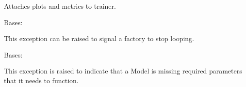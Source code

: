 \documentclass[letterpaper,10pt,english]{sphinxmanual}
\begin{document}
\begin{fulllineitems}

\begin{fulllineitems}
\label{\detokenize{Fireworks:Fireworks.toolbox.preprocessing.Normalizer.reset}}
\end{fulllineitems}


\end{fulllineitems}

\label{\detokenize{Fireworks:module-Fireworks.utils.events}}

\begin{fulllineitems}
\label{\detokenize{Fireworks:Fireworks.utils.events.visdom_loss_handler}}
Attaches plots and metrics to trainer.

\end{fulllineitems}

\label{\detokenize{Fireworks:module-Fireworks.utils.exceptions}}

\begin{fulllineitems}
\label{\detokenize{Fireworks:Fireworks.utils.exceptions.EndHyperparameterOptimization}}
Bases: 

This exception can be raised to signal a factory to stop looping.

\end{fulllineitems}


\begin{fulllineitems}
\label{\detokenize{Fireworks:Fireworks.utils.exceptions.ParameterizationError}}
Bases: 

This exception is raised to indicate that a Model is missing required parameters that it needs to function.

\end{fulllineitems}
\end{document}
